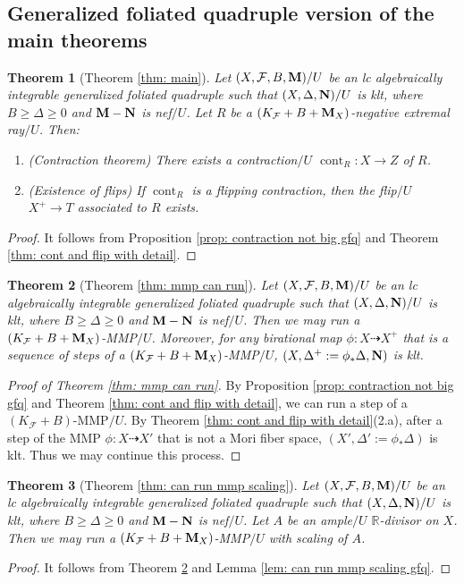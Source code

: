 \documentclass[11pt]{amsart}
\numberwithin{equation}{section}
\newcommand{\Mm}{{\bf{M}}}
\newcommand{\Nn}{{\bf{N}}}
\newcommand{\Rr}{\mathbb{R}}
\newcommand{\cont}{\operatorname{cont}}
\newcommand{\Ff}{\mathcal{F}}
\newtheorem{thm}{Theorem}[section]
\theoremstyle{definition}
\theoremstyle{definition}
\theoremstyle{definition}
\begin{document}
\subsection{Generalized foliated quadruple version of the main theorems}

\begin{thm}[Theorem \ref{thm: main}]\label{thm: main gfq}
Let $(X,\Ff,B,\Mm)/U$ be an lc algebraically integrable generalized foliated quadruple such that $(X,\Delta,\Nn)/U$ is klt, where $B\geq\Delta\geq 0$ and $\Mm-\Nn$ is nef$/U$.  Let $R$ be a $(K_{\Ff}+B+\Mm_X)$-negative extremal ray$/U$. Then:
    \begin{enumerate}
        \item (Contraction theorem) There exists a contraction$/U$ $\cont_R: X\rightarrow Z$ of $R$.
        \item (Existence of flips) If $\cont_R$ is a flipping contraction, then the flip$/U$ $X^+\rightarrow T$ associated to $R$ exists.
    \end{enumerate}   
\end{thm}
\begin{proof}
    It follows from Proposition \ref{prop: contraction not big gfq} and Theorem \ref{thm: cont and flip with detail}.
\end{proof}

\begin{thm}[Theorem \ref{thm: mmp can run}]\label{thm: mmp can run gfq}
Let $(X,\Ff,B,\Mm)/U$ be an lc algebraically integrable generalized foliated quadruple such that $(X,\Delta,\Nn)/U$ is klt, where $B\geq\Delta\geq 0$ and $\Mm-\Nn$ is nef$/U$. Then we may run a $(K_{\Ff}+B+\Mm_X)$-MMP$/U$. Moreover, for any birational map $\phi: X\dashrightarrow X^+$ that is a sequence of steps of a $(K_{\Ff}+B+\Mm_X)$-MMP$/U$, $(X,\Delta^+:=\phi_*\Delta,\Nn)$ is klt.
\end{thm}
\begin{proof}[Proof of Theorem \ref{thm: mmp can run}]
    By Proposition \ref{prop: contraction not big gfq} and Theorem \ref{thm: cont and flip with detail}, we can run a step of a $(K_{\Ff}+B)$-MMP$/U$. By Theorem \ref{thm: cont and flip with detail}(2.a), after a step of the MMP $\phi: X\dashrightarrow X'$ that is not a Mori fiber space, $(X',\Delta':=\phi_*\Delta)$ is klt. Thus we may continue this process. 
\end{proof}

\begin{thm}[Theorem \ref{thm: can run mmp scaling}]\label{thm: can run mmp scaling gfq}
Let $(X,\Ff,B,\Mm)/U$ be an lc algebraically integrable generalized foliated quadruple such that $(X,\Delta,\Nn)/U$ is klt, where $B\geq\Delta\geq 0$ and $\Mm-\Nn$ is nef$/U$. Let $A$ be an ample$/U$ $\Rr$-divisor on $X$. Then we may run a $(K_{\Ff}+B+\Mm_X)$-MMP$/U$ with scaling of $A$. 
\end{thm}
\begin{proof}
    It follows from Theorem \ref{thm: mmp can run gfq} and Lemma \ref{lem: can run mmp scaling gfq}.
\end{proof}
\end{document}
